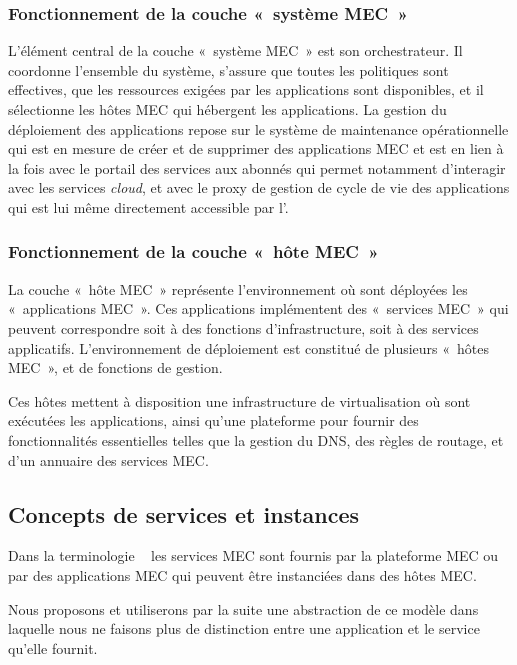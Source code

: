 \documentclass[../main.tex]{subfiles}
\begin{document}
\subsubsection{Fonctionnement de la couche « système MEC »}
L’élément central de la couche « système MEC » est son orchestrateur. Il coordonne l’ensemble du système, s’assure que toutes les politiques sont effectives, que les ressources exigées par les applications sont disponibles, et il sélectionne les hôtes MEC qui hébergent les applications. La gestion du déploiement des applications repose sur le système de maintenance opérationnelle  qui est en mesure de créer et de supprimer des applications MEC et est en lien à la fois avec le portail des services aux abonnés qui permet notamment d’interagir avec les services \textit{cloud}, et avec le proxy de gestion de cycle de vie des applications qui est lui même directement accessible par l’.

\pagebreak

\subsubsection{Fonctionnement de la couche « hôte MEC »}
La couche « hôte MEC » représente l’environnement où sont déployées les « applications MEC ». Ces applications implémentent des « services MEC » qui peuvent correspondre soit à des fonctions d’infrastructure, soit à des services applicatifs. L’environnement de déploiement est constitué de plusieurs « hôtes MEC », et de fonctions de gestion.

Ces hôtes mettent à disposition une infrastructure de virtualisation où sont exécutées les applications, ainsi qu’une plateforme pour fournir des fonctionnalités essentielles telles que la gestion du DNS, des règles de routage, et d’un annuaire des services MEC.

\subsection{Concepts de services et instances}
\label{sec:service-instances}
Dans la terminologie ~\cite{ETSI.GR.MEC.001} les services MEC sont fournis par la plateforme MEC ou par des applications MEC qui peuvent être instanciées dans des hôtes MEC.

Nous proposons et utiliserons par la suite une abstraction de ce modèle dans laquelle nous ne faisons plus de distinction entre une application et le service qu’elle fournit.
\end{document}
